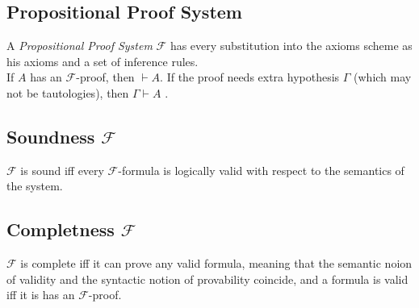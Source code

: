 \documentclass[a4paper]{article}
\newcommand\vdashsub[1]{\mathrel{\stackengine{.4ex}{\vdash}{\;\;\scriptscriptstyle#1}{U}{c}{F}{T}{L}}}
\begin{document}
\subsection{Propositional Proof System}

A \textit{Propositional Proof System}
\(\mathcal{F}\) has every substitution into the
axioms scheme as his axioms and a set of inference rules.
\\
If \(A\) has an \(\mathcal{F}\)-proof,
then \(\vdash A\). %
If the proof needs extra hypothesis \(\Gamma\)
(which may not be tautologies), then \(\Gamma\vdash A\)
.%

\subsection{Soundness \(\mathcal{F}\)}

\(\mathcal{F}\) is sound iff every \(\mathcal{F}\)-formula is logically valid with respect to the semantics of the system. 

\subsection{Completness \(\mathcal{F}\)}

\(\mathcal{F}\) is complete iff
it can prove any valid formula, meaning that
the semantic noion of validity
and the syntactic notion of provability coincide,
and a formula is valid iff it is has an
\(\mathcal{F}\)-proof.
\end{document}
